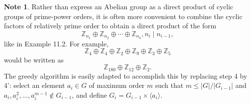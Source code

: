 \documentclass{article}
\newtheorem{corollary}{Corollary}[theorem]
\theoremstyle{definition}
\newtheorem{note}{Note}[section]
\begin{document}
   \begin{note}
       Rather than express an Abelian group as a direct product of cyclic groups of prime-power orders, it is often more convenient to combine the cyclic factors of relatively prime order to obtain a direct product of the form
       \begin{equation*}
           \mathbb{Z}_{n_1}\oplus\mathbb{Z}_{n_2}\oplus\cdots\oplus\mathbb{Z}_{n_k}, n_i \mid n_{i-1},
       \end{equation*}
       like in Example 11.2. For example,
       \begin{equation*}
           \mathbb{Z}_4\oplus\mathbb{Z}_4\oplus\mathbb{Z}_2\oplus\mathbb{Z}_9\oplus\mathbb{Z}_3\oplus\mathbb{Z}_5
       \end{equation*}
       would be written as
       \begin{equation*}
           \mathbb{Z}_{180}\oplus\mathbb{Z}_{12}\oplus\mathbb{Z}_2.
       \end{equation*}
       The greedy algorithm is easily adapted to accomplish this by replacing step 4 by 4': select an element $a_i \in G$ of maximum order $m$ such that $m\leq|G|/|G_{i-1}|$ and $a_i,a_i^2,\dots,a_i^{m-1} \notin G_{i-1}$,
       and define $G_i=G_{i-1}\times\langle a_i \rangle$.
   \end{note}
    
    \noindent{}
    
\end{document}
